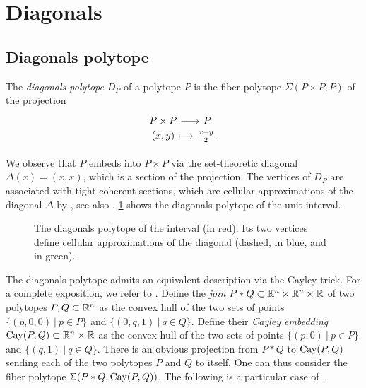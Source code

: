 
\section{Diagonals} \label{s:diagonals}


\subsection{Diagonals polytope}

\begin{definition}
	The \emph{diagonals polytope} $D_P$ of a polytope $P$ is the fiber polytope $\Sigma(P\times P, P)$ of the projection
	\[
	\begin{tikzcd}[row sep=-2,column sep=small]
		P \times P \arrow[r] & P \\
		(x,y) \arrow[r,mapsto] &\textstyle\frac{x+y}{2}.
	\end{tikzcd}
	\]
\end{definition}

We observe that $P$ embeds into $P\times P$ via the set-theoretic diagonal $\Delta (x)=(x,x)$, which is a section of the projection.
The vertices of $D_P$ are associated with tight coherent sections, which are cellular approximations of the diagonal $\Delta$ by \cite[Proposition 5]{MTTV19}, see also \cite[Proposition 1.1]{GLA21}.
\cref{f:diagonal-interval} shows the diagonals polytope of the unit interval.

\begin{figure}[h!]
	\centering
	
	\caption{The diagonals polytope of the interval (in red). Its two vertices define cellular approximations of the diagonal (dashed, in blue, and in green).}
	\label{f:diagonal-interval}
\end{figure}

The diagonals polytope admits an equivalent description via the Cayley trick.
For a complete exposition, we refer to \cite[Section 9.2]{deloeraTriangulations2010}.
Define the \emph{join} $P * Q \subset \mathbb{R}^n \times \mathbb{R}^n \times \mathbb{R}$ of two polytopes $P,Q \subset \mathbb{R}^n$ as the convex hull of the two sets of points $\{(p,0,0) \ | \ p \in P \}$ and $\{(0,q,1) \ | \ q \in Q\}$.
Define their \emph{Cayley embedding} $\operatorname{Cay}(P,Q) \subset \mathbb{R}^n \times \mathbb{R}$ as the convex hull of the two sets of points $\{(p,0) \ | \ p \in P \}$ and $\{(q,1) \ | \ q \in Q\}$.
There is an obvious projection from $P * Q$ to $\operatorname{Cay}(P,Q)$ sending each of the two polytopes $P$ and $Q$ to itself.
One can thus consider the fiber polytope $\Sigma(P*Q,\operatorname{Cay}(P,Q))$.
The following is a particular case of \cite[Theorem 3.1]{huberCayleyTrickLifting2000}.

